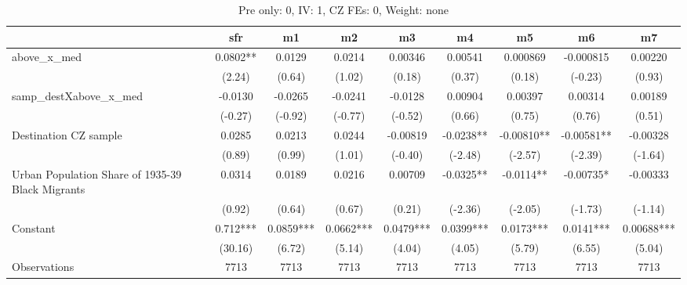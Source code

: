 \begin{table}[htbp]\centering
\def\sym#1{\ifmmode^{#1}\else\(^{#1}\)\fi}
\caption{Pre only: 0, IV: 1, CZ FEs: 0, Weight: none}
\begin{tabular}{l*{8}{c}}
\toprule
                    &\multicolumn{1}{c}{sfr}&\multicolumn{1}{c}{m1}&\multicolumn{1}{c}{m2}&\multicolumn{1}{c}{m3}&\multicolumn{1}{c}{m4}&\multicolumn{1}{c}{m5}&\multicolumn{1}{c}{m6}&\multicolumn{1}{c}{m7}\\
\midrule
above\_x\_med         &      0.0802** &      0.0129   &      0.0214   &     0.00346   &     0.00541   &    0.000869   &   -0.000815   &     0.00220   \\
                    &      (2.24)   &      (0.64)   &      (1.02)   &      (0.18)   &      (0.37)   &      (0.18)   &     (-0.23)   &      (0.93)   \\
\addlinespace
samp\_destXabove\_x\_med&     -0.0130   &     -0.0265   &     -0.0241   &     -0.0128   &     0.00904   &     0.00397   &     0.00314   &     0.00189   \\
                    &     (-0.27)   &     (-0.92)   &     (-0.77)   &     (-0.52)   &      (0.66)   &      (0.75)   &      (0.76)   &      (0.51)   \\
\addlinespace
Destination CZ sample&      0.0285   &      0.0213   &      0.0244   &    -0.00819   &     -0.0238** &    -0.00810** &    -0.00581** &    -0.00328   \\
                    &      (0.89)   &      (0.99)   &      (1.01)   &     (-0.40)   &     (-2.48)   &     (-2.57)   &     (-2.39)   &     (-1.64)   \\
\addlinespace
Urban Population Share of 1935-39 Black Migrants&      0.0314   &      0.0189   &      0.0216   &     0.00709   &     -0.0325** &     -0.0114** &    -0.00735*  &    -0.00333   \\
                    &      (0.92)   &      (0.64)   &      (0.67)   &      (0.21)   &     (-2.36)   &     (-2.05)   &     (-1.73)   &     (-1.14)   \\
\addlinespace
Constant            &       0.712***&      0.0859***&      0.0662***&      0.0479***&      0.0399***&      0.0173***&      0.0141***&     0.00688***\\
                    &     (30.16)   &      (6.72)   &      (5.14)   &      (4.04)   &      (4.05)   &      (5.79)   &      (6.55)   &      (5.04)   \\
\midrule
Observations        &        7713   &        7713   &        7713   &        7713   &        7713   &        7713   &        7713   &        7713   \\

\end{tabular}
\end{table}
